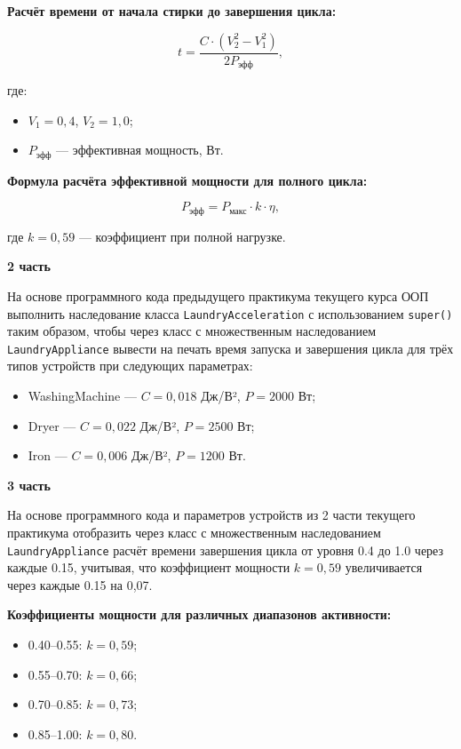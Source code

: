 \begin{enumerate}
\textbf{Расчёт времени от начала стирки до завершения цикла:}

\begin{equation}
t = \frac{C \cdot (V_2^2 - V_1^2)}{2P_{\text{эфф}}},
\end{equation}

где:  
\begin{itemize}
    \item $V_1 = 0{,}4$, $V_2 = 1{,}0$;  
    \item $P_{\text{эфф}}$ — эффективная мощность, Вт.  
\end{itemize}

\textbf{Формула расчёта эффективной мощности для полного цикла:}

\begin{equation}
P_{\text{эфф}} = P_{\text{макс}} \cdot k \cdot \eta,
\end{equation}

где $k = 0{,}59$ — коэффициент при полной нагрузке.

\textbf{2 часть}

На основе программного кода предыдущего практикума текущего курса ООП выполнить наследование класса \texttt{LaundryAcceleration} с использованием \texttt{super()} таким образом, чтобы через класс с множественным наследованием \texttt{LaundryAppliance} вывести на печать время запуска и завершения цикла для трёх типов устройств при следующих параметрах:

\begin{itemize}
    \item WashingMachine — $C = 0{,}018$ Дж/В², $P = 2000$ Вт;  
    \item Dryer — $C = 0{,}022$ Дж/В², $P = 2500$ Вт;  
    \item Iron — $C = 0{,}006$ Дж/В², $P = 1200$ Вт.  
\end{itemize}

\textbf{3 часть}

На основе программного кода и параметров устройств из 2 части текущего практикума отобразить через класс с множественным наследованием \texttt{LaundryAppliance} расчёт времени завершения цикла от уровня 0.4 до 1.0 через каждые 0.15, учитывая, что коэффициент мощности $k = 0{,}59$ увеличивается через каждые 0.15 на 0{,}07.

\textbf{Коэффициенты мощности для различных диапазонов активности:}
\begin{itemize}
    \item 0.40–0.55: $k = 0{,}59$;  
    \item 0.55–0.70: $k = 0{,}66$;  
    \item 0.70–0.85: $k = 0{,}73$;  
    \item 0.85–1.00: $k = 0{,}80$.  
\end{itemize}



\end{enumerate}
